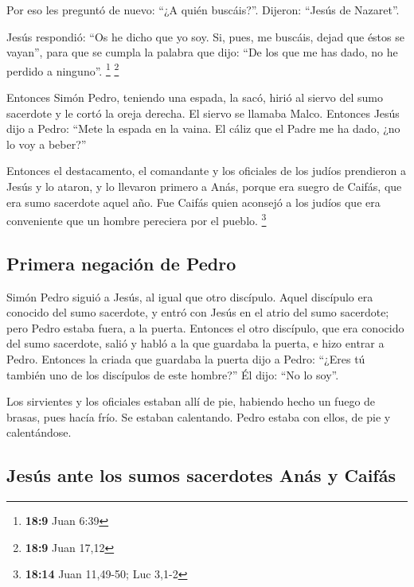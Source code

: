  Por eso les preguntó de nuevo: ``¿A quién buscáis?''.
Dijeron: ``Jesús de Nazaret''.

 Jesús respondió: ``Os he dicho que yo soy. Si, pues, me
buscáis, dejad que éstos se vayan'',  para que se cumpla
la palabra que dijo: ``De los que me has dado, no he perdido a
ninguno''. \footnote{\textbf{18:9} Juan 6:39} \footnote{\textbf{18:9}
  Juan 17,12}

 Entonces Simón Pedro, teniendo una espada, la sacó,
hirió al siervo del sumo sacerdote y le cortó la oreja derecha. El
siervo se llamaba Malco.  Entonces Jesús dijo a Pedro:
``Mete la espada en la vaina. El cáliz que el Padre me ha dado, ¿no lo
voy a beber?''

 Entonces el destacamento, el comandante y los oficiales
de los judíos prendieron a Jesús y lo ataron,  y lo
llevaron primero a Anás, porque era suegro de Caifás, que era sumo
sacerdote aquel año.  Fue Caifás quien aconsejó a los
judíos que era conveniente que un hombre pereciera por el pueblo.
\footnote{\textbf{18:14} Juan 11,49-50; Luc 3,1-2}

\hypertarget{primera-negaciuxf3n-de-pedro}{%
\subsection{Primera negación de
Pedro}\label{primera-negaciuxf3n-de-pedro}}

 Simón Pedro siguió a Jesús, al igual que otro discípulo.
Aquel discípulo era conocido del sumo sacerdote, y entró con Jesús en el
atrio del sumo sacerdote;  pero Pedro estaba fuera, a la
puerta. Entonces el otro discípulo, que era conocido del sumo sacerdote,
salió y habló a la que guardaba la puerta, e hizo entrar a Pedro.
 Entonces la criada que guardaba la puerta dijo a Pedro:
``¿Eres tú también uno de los discípulos de este hombre?'' Él dijo: ``No
lo soy''.

 Los sirvientes y los oficiales estaban allí de pie,
habiendo hecho un fuego de brasas, pues hacía frío. Se estaban
calentando. Pedro estaba con ellos, de pie y calentándose.

\hypertarget{jesuxfas-ante-los-sumos-sacerdotes-anuxe1s-y-caifuxe1s}{%
\subsection{Jesús ante los sumos sacerdotes Anás y
Caifás}\label{jesuxfas-ante-los-sumos-sacerdotes-anuxe1s-y-caifuxe1s}}


